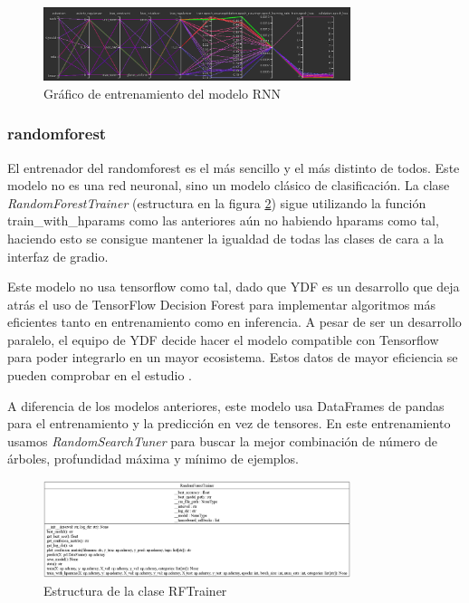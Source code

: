\begin{figure}[H]
    \centering
    \includegraphics[width=0.8\textwidth]{Imagenes/Bitmap/tb-rnn-0.8.png}
    \caption{Gráfico de entrenamiento del modelo RNN}
    \label{fig:rnn-0.8-grafico-ejemplo}
\end{figure}

\subsubsection{\gls{randomforest}}

El entrenador del \gls{randomforest} es el más sencillo y el más distinto de todos. Este modelo no es una red neuronal, sino un modelo clásico de clasificación. La clase \textit{RandomForestTrainer} (estructura en la figura \ref{fig:rf-estructura}) sigue utilizando la función train\_with\_hparams como las anteriores aún no habiendo hparams como tal, haciendo esto se consigue mantener la igualdad de todas las clases de cara a la interfaz de gradio.

Este modelo no usa tensorflow como tal, dado que YDF es un desarrollo que deja atrás el uso de TensorFlow Decision Forest para implementar algoritmos más eficientes tanto en entrenamiento como en inferencia. A pesar de ser un desarrollo paralelo, el equipo de YDF decide hacer el modelo compatible con Tensorflow para poder integrarlo en un mayor ecosistema. Estos datos de mayor eficiencia se pueden comprobar en el estudio \cite{GBBSP23}.

A diferencia de los modelos anteriores, este modelo usa DataFrames de pandas para el entrenamiento y la predicción en vez de tensores. En este entrenamiento usamos \textit{RandomSearchTuner} para buscar la mejor combinación de número de árboles, profundidad máxima y mínimo de ejemplos.

\begin{figure}[h!]
    \centering
    \includegraphics[width=0.8\textwidth]{Imagenes/Bitmap/classes_RandomForestTrainer.png}
    \caption{Estructura de la clase RFTrainer}
    \label{fig:rf-estructura}
\end{figure}

